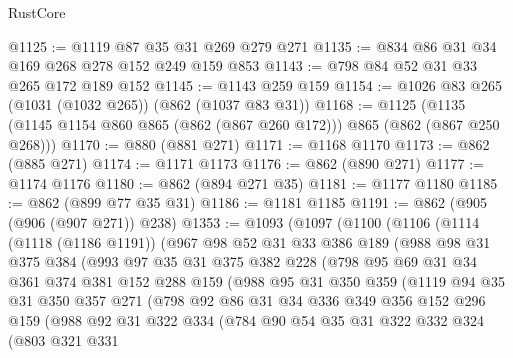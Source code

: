 \begin{lexlean}{RustCore}
\begin{coremodule}
@1125 := @1119 @87 @35 @31 @269 @279 @271
@1135 := @834 @86 @31 @34 @169 @268 @278 @152 @249 @159 @853
@1143 := @798 @84 @52 @31 @33 @265 @172 @189 @152
@1145 := @1143 @259 @159
@1154 := @1026 @83 @265 (@1031 (@1032 @265)) (@862 (@1037 @83 @31))
@1168 := @1125 (@1135 (@1145 @1154 @860 @865 (@862 (@867 @260 @172))) @865 (@862 (@867 @250 @268)))
@1170 := @880 (@881 @271)
@1171 := @1168 @1170
@1173 := @862 (@885 @271)
@1174 := @1171 @1173
@1176 := @862 (@890 @271)
@1177 := @1174 @1176
@1180 := @862 (@894 @271 @35)
@1181 := @1177 @1180
@1185 := @862 (@899 @77 @35 @31)
@1186 := @1181 @1185
@1191 := @862 (@905 (@906 (@907 @271)) @238)
@1353 := @1093
    (@1097
      (@1100
        (@1106
          (@1114
            (@1118 (@1186 @1191))
            (@967
              @98
              @52
              @31
              @33
              @386
              @189
              (@988
                @98
                @31
                @375
                @384
                (@993
                  @97
                  @35
                  @31
                  @375
                  @382
                  @228
                  (@798
                    @95
                    @69
                    @31
                    @34
                    @361
                    @374
                    @381
                    @152
                    @288
                    @159
                    (@988
                      @95
                      @31
                      @350
                      @359
                      (@1119
                        @94
                        @35
                        @31
                        @350
                        @357
                        @271
                        (@798
                          @92
                          @86
                          @31
                          @34
                          @336
                          @349
                          @356
                          @152
                          @296
                          @159
                          (@988
                            @92
                            @31
                            @322
                            @334
                            (@784
                              @90
                              @54
                              @35
                              @31
                              @322
                              @332
                              @324
                              (@803
                                @321
                                @331

\end{coremodule}
\end{lexlean}
